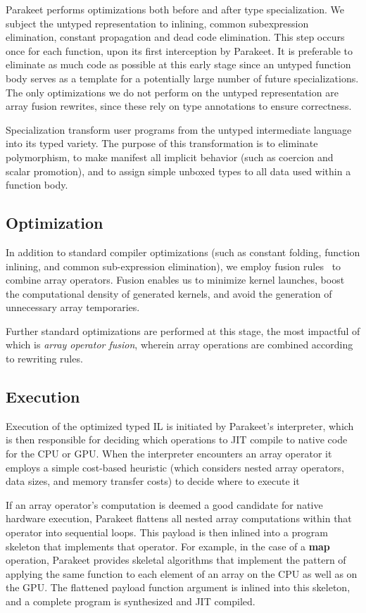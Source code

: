 \documentclass[10pt,twocolumn]{article}
\begin{document}
Parakeet performs optimizations both before and after type specialization. We subject the untyped representation to inlining, common subexpression elimination, constant propagation and dead code elimination. This step occurs once for each function, upon its first interception by Parakeet. It is preferable to eliminate as much code as possible at this early stage since an untyped function body serves as a template for a potentially large number of future specializations. The only optimizations we do not perform on the untyped representation are array fusion rewrites, since these rely on type annotations to ensure correctness.

Specialization transform user programs from the untyped intermediate language into its typed variety. The purpose of this transformation is to eliminate polymorphism, to make manifest all implicit behavior (such as coercion and scalar promotion), and to assign simple unboxed types to all data used within a function body. 

\subsection{Optimization}
In addition to standard compiler optimizations (such as constant folding, function inlining, and common sub-expression elimination), we employ fusion rules~\cite{Jones01} to combine array operators. Fusion enables us to minimize kernel launches, boost the computational density of generated kernels, and avoid the generation of unnecessary array temporaries.

Further standard optimizations are performed at this stage, the most impactful of which is \emph{array operator fusion}, wherein array operations are combined according to rewriting rules. 

\subsection{Execution}

Execution of the optimized typed IL is initiated by Parakeet's interpreter, which is then responsible for deciding which operations to JIT compile to native code for the CPU or GPU. When the interpreter encounters an array operator it employs a simple cost-based heuristic (which considers nested array operators, data sizes, and memory transfer costs) to decide where to execute it 

If an array operator's computation is deemed a good candidate for native hardware execution, Parakeet flattens all nested array computations within that operator into sequential loops.  This payload is then inlined into a program skeleton that implements that operator.  For example, in the case of a \textbf{map} operation, Parakeet provides skeletal algorithms that implement the pattern of applying the same function to each element of an array on the CPU as well as on the GPU.  The flattened payload function argument is inlined into this skeleton, and a complete program is synthesized and JIT compiled.
\end{document}
